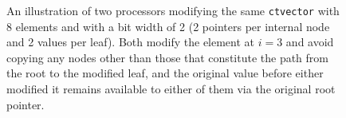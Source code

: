 \begin{figure}
\caption{An illustration of two processors modifying the same \texttt{ctvector}
with 8 elements and with a bit width of 2 (2 pointers per internal node and 2
values per leaf). Both modify the element at $i=3$ and avoid copying any nodes
other than those that constitute the path from the root to the modified leaf,
and the original value before either modified it remains available to either of
them via the original root pointer.}
\label{diagram}
\end{figure}

